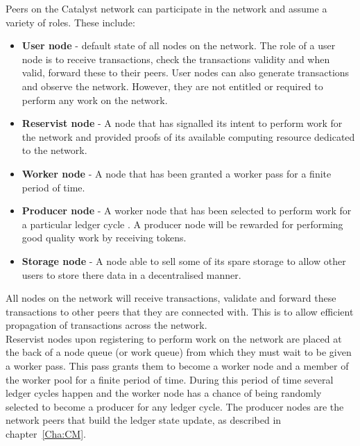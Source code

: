 Peers on the Catalyst network can participate in the network and assume a variety of roles. These include:

\begin{itemize}

\item \textbf{User node} - default state of all nodes on the network. The role of a user node is to receive transactions, check the transactions validity and when valid, forward these to their peers. User nodes can also generate transactions and observe the network. However, they are not entitled or required to perform any work on the network. 

\item \textbf{Reservist node} - A node that has signalled  its intent to perform work for the network and provided proofs of its available computing resource dedicated to the network.

\item \textbf{Worker node} - A node that has been granted a worker pass for a finite period of time. 

\item \textbf{Producer node} - A worker node that has been selected to perform work for a particular ledger cycle . A producer node will be rewarded for performing good quality work by receiving tokens. 

\item \textbf{Storage node} - A node able to sell some of its spare storage to allow other users to store there data in a decentralised manner. 

\end{itemize}

All nodes on the network will receive transactions, validate and forward these transactions to other peers that they are connected with. This is to allow efficient propagation of transactions across the network. \\

Reservist nodes upon registering to perform work on the network are placed at the back of a node queue (or work queue) from which they must wait to be given a worker pass. This pass grants them to become a worker node and a member of the worker pool for a finite period of time. During this period of time several ledger cycles happen and the worker node has a chance of being randomly selected to become a producer for any ledger cycle. The producer nodes are the network peers that build the ledger state update, as described in chapter~\ref{Cha:CM}. 